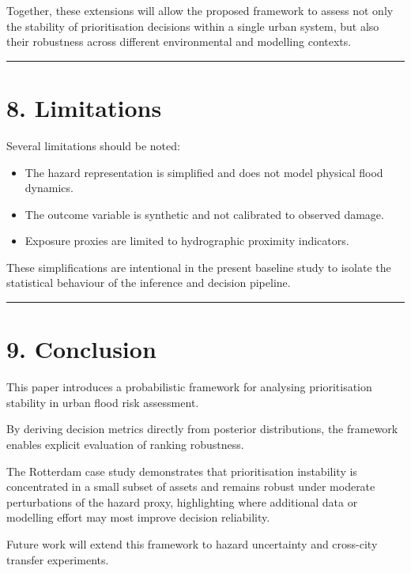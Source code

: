 \documentclass[
]{article}
\providecommand{\tightlist}{%
  \setlength{\itemsep}{0pt}\setlength{\parskip}{0pt}}
\begin{document}
Together, these extensions will allow the proposed framework to assess
not only the stability of prioritisation decisions within a single urban
system, but also their robustness across different environmental and
modelling contexts.

\begin{center}\rule{0.5\linewidth}{0.5pt}\end{center}

\section{8. Limitations}\label{limitations}

Several limitations should be noted:

\begin{itemize}
\tightlist
\item
  The hazard representation is simplified and does not model physical
  flood dynamics.
\item
  The outcome variable is synthetic and not calibrated to observed
  damage.
\item
  Exposure proxies are limited to hydrographic proximity indicators.
\end{itemize}

These simplifications are intentional in the present baseline study to
isolate the statistical behaviour of the inference and decision
pipeline.

\begin{center}\rule{0.5\linewidth}{0.5pt}\end{center}

\section{9. Conclusion}\label{conclusion}

This paper introduces a probabilistic framework for analysing
prioritisation stability in urban flood risk assessment.

By deriving decision metrics directly from posterior distributions, the
framework enables explicit evaluation of ranking robustness.

The Rotterdam case study demonstrates that prioritisation instability is
concentrated in a small subset of assets and remains robust under
moderate perturbations of the hazard proxy, highlighting where
additional data or modelling effort may most improve decision
reliability.

Future work will extend this framework to hazard uncertainty and
cross-city transfer experiments.
\end{document}

